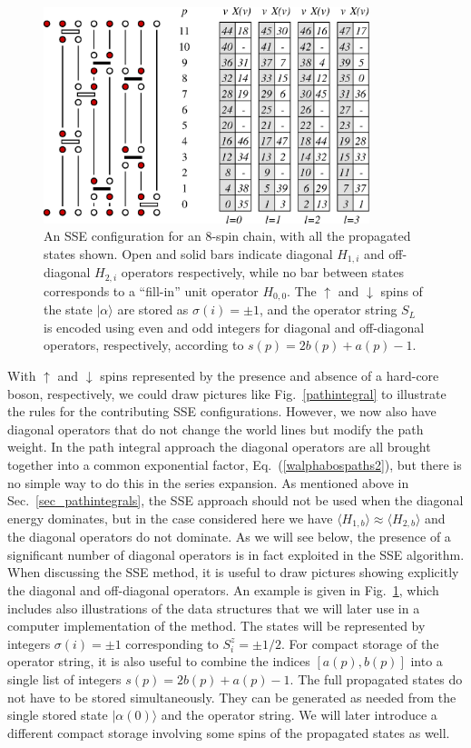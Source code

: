 \documentclass[draft,numberedheadings]{aipproc}
\newcommand{\dn}{\downarrow}
\newcommand{\up}{\uparrow}
\begin{document}
\begin{figure}
\includegraphics[width=9.5cm]{sseconfig2.eps}
\caption{An SSE configuration for an 8-spin chain, with all the propagated states shown. Open and solid bars indicate diagonal $H_{1,i}$ and off-diagonal 
$H_{2,i}$ operators respectively, while no bar between states corresponds to a ``fill-in'' unit operator $H_{0,0}$. The $\up$ and $\dn$ spins of the state 
$|\alpha\rangle$ are stored as $\sigma(i)=\pm 1$, and the operator string $S_L$ is encoded using even and odd integers for diagonal and off-diagonal
operators, respectively, according to $s(p)=2b(p)+a(p)-1$.}
\label{sseconfig1}
\end{figure}

With $\up$ and $\dn$ spins represented by the presence and absence of a hard-core boson, respectively, we could draw pictures like Fig.~\ref{pathintegral} to 
illustrate the rules for the contributing SSE configurations. However, we now also have diagonal operators that do not change the world lines but modify the path 
weight. In the path integral approach the diagonal operators are all brought together into a common exponential factor, Eq.~(\ref{walphabospaths2}), but there is 
no simple way to do this in the series expansion. As mentioned above in Sec.~\ref{sec_pathintegrals},  the SSE approach should not be used when the diagonal 
energy dominates, but in the case considered here we have $\langle H_{1,b}\rangle \approx \langle H_{2,b}\rangle$ and the diagonal operators do not dominate. As we 
will see below, the presence of a significant number of diagonal operators is in fact exploited in the SSE algorithm. When discussing the SSE method, it is useful 
to draw pictures showing explicitly the diagonal and off-diagonal operators. An example is given in Fig.~\ref{sseconfig1}, which includes also illustrations of the 
data structures that we will later  use in a computer implementation of the method. The states will be represented by integers $\sigma(i)=\pm 1$ corresponding 
to $S^z_i=\pm 1/2$. For compact storage of the operator string, it is also useful to combine the indices $[a(p),b(p)]$ into a single list of integers 
$s(p)=2b(p)+a(p)-1$. The full propagated states do not have to be stored simultaneously. They can be generated as needed from the single stored state 
$|\alpha(0)\rangle$ and the operator string. We will later introduce a different compact storage involving some spins of the propagated states as well.
\end{document}
